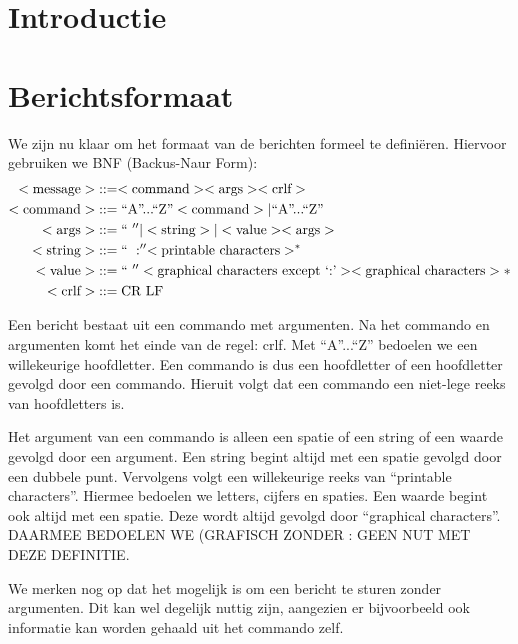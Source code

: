 \documentclass[a4paper,11pt]{article}
\begin{document}
	
	
	\tableofcontents
	\newpage

	\section{Introductie}
	
	\newpage
    
    
    \section{Berichtsformaat}
    We zijn nu klaar om het formaat van de berichten formeel te defini\"eren. Hiervoor gebruiken we BNF (Backus-Naur Form):
    \begin{align*}
    <\text{message}> &::= <\text{command}> <\text{args}> <\text{crlf}> \\
    <\text{command}> &::= \text{``A''...``Z''} <\text{command}> | \text{``A''...``Z''} \\
    <\text{args}>    &::= ``\text{ }'' | <\text{string}> | <\text{value}> <\text{args}> \\
    <\text{string}>  &::= ``\text{ }:'' <\text{printable characters}>^{*} \\
    <\text{value}>   &::= ``\text{ }'' <\text{graphical characters except `:'}> <\text{graphical characters}>* \\
    <\text{crlf}>    &::= \text{CR LF}
    \end{align*}

    Een bericht bestaat uit een commando met argumenten. Na het commando en argumenten komt het einde van de regel: crlf. Met ``A''...``Z'' bedoelen we een willekeurige hoofdletter. Een commando is dus een hoofdletter of een hoofdletter gevolgd door een commando. Hieruit volgt dat een commando een niet-lege reeks van hoofdletters is.

    Het argument van een commando is alleen een spatie of een string of een waarde gevolgd door een argument. Een string begint altijd met een spatie gevolgd door een dubbele punt. Vervolgens volgt een willekeurige reeks van ``printable characters''. Hiermee bedoelen we letters, cijfers en spaties. Een waarde begint ook altijd met een spatie. Deze wordt altijd gevolgd door ``graphical characters''. DAARMEE BEDOELEN WE (GRAFISCH ZONDER : GEEN NUT MET DEZE DEFINITIE.

    We merken nog op dat het mogelijk is om een bericht te sturen zonder argumenten. Dit kan wel degelijk nuttig zijn, aangezien er bijvoorbeeld ook informatie kan worden gehaald uit het commando zelf.
\end{document}
